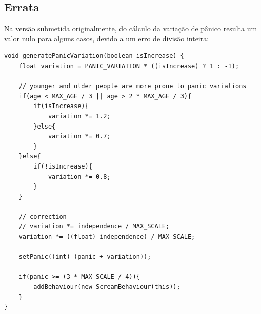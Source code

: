 \documentclass[12pt]{article}
\begin{document}
\begin{titlepage}
\subsection{Errata}

Na versão submetida originalmente, do cálculo da variação de pânico resulta um valor nulo para alguns casos, devido a um erro de divisão inteira:

\begin{lstlisting}
void generatePanicVariation(boolean isIncrease) {
	float variation = PANIC_VARIATION * ((isIncrease) ? 1 : -1);
	
	// younger and older people are more prone to panic variations 
	if(age < MAX_AGE / 3 || age > 2 * MAX_AGE / 3){
		if(isIncrease){
			variation *= 1.2;	
		}else{
			variation *= 0.7;
		}
	}else{
		if(!isIncrease){
			variation *= 0.8;
		}
	}
	
	// correction
	// variation *= independence / MAX_SCALE; 
	variation *= ((float) independence) / MAX_SCALE; 
	
	setPanic((int) (panic + variation));		
	
	if(panic >= (3 * MAX_SCALE / 4)){
		addBehaviour(new ScreamBehaviour(this));
	}
}
\end{lstlisting}

\end{titlepage}
\end{document}
